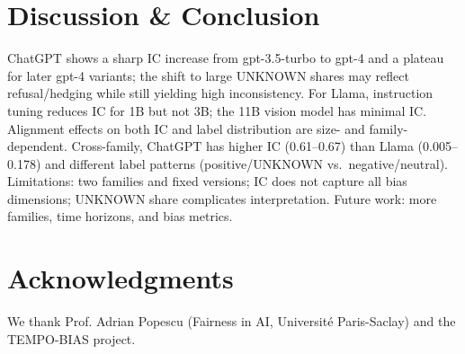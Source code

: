\documentclass[11pt]{article}
\begin{document}
\section{Discussion \& Conclusion}

ChatGPT shows a sharp IC increase from gpt-3.5-turbo to gpt-4 and a plateau for later gpt-4 variants; the shift to large UNKNOWN shares may reflect refusal/hedging while still yielding high inconsistency. For Llama, instruction tuning reduces IC for 1B but not 3B; the 11B vision model has minimal IC. Alignment effects on both IC and label distribution are size- and family-dependent. Cross-family, ChatGPT has higher IC (0.61--0.67) than Llama (0.005--0.178) and different label patterns (positive/UNKNOWN vs.\ negative/neutral). Limitations: two families and fixed versions; IC does not capture all bias dimensions; UNKNOWN share complicates interpretation. Future work: more families, time horizons, and bias metrics.

\section*{Acknowledgments}
We thank Prof. Adrian Popescu (Fairness in AI, Université Paris-Saclay) and the TEMPO-BIAS project.


\end{document}
